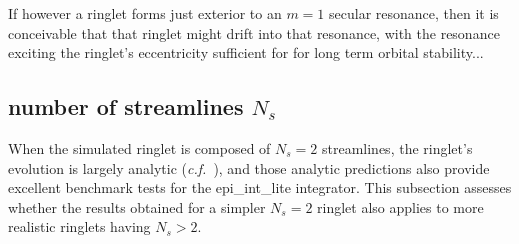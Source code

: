 \documentclass[preprint]{aastex62}
\begin{document}
If however a ringlet forms just exterior to an $m=1$ secular resonance, then it is conceivable
that that ringlet might drift into that resonance, with the resonance
exciting the ringlet's eccentricity sufficient for
for long term orbital stability...


\subsection{number of streamlines $N_s$}
\label{subsec:streamlines}

When the simulated ringlet is composed of $N_s=2$ streamlines, the ringlet's
evolution is largely analytic ({\it c.f.}\ \citealt{BGT82, BGT83}), and those analytic
predictions also provide excellent benchmark tests for the epi\_int\_lite integrator. This subsection 
assesses whether the results obtained for a simpler $N_s=2$ ringlet also applies to
more realistic ringlets having $N_s>2$.
\end{document}

